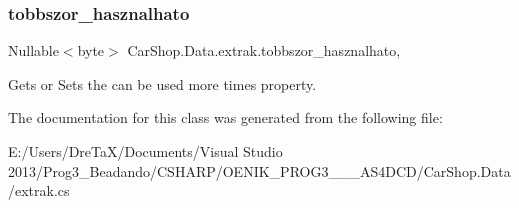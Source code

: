 \mbox{\label{class_car_shop_1_1_data_1_1extrak_a93236e77dec6453b89b5a944ba1c34e7}} 
\subsubsection{\texorpdfstring{tobbszor\+\_\+hasznalhato}{tobbszor\_hasznalhato}}
{\footnotesize\ttfamily Nullable$<$byte$>$ Car\+Shop.\+Data.\+extrak.\+tobbszor\+\_\+hasznalhato\hspace{0.3cm}{\ttfamily [get]}, {\ttfamily [set]}}



Gets or Sets the \textquotesingle{}can be used more times\textquotesingle{} property. 



The documentation for this class was generated from the following file\+:\begin{DoxyCompactItemize}
\item 
E\+:/\+Users/\+Dre\+Ta\+X/\+Documents/\+Visual Studio 2013/\+Prog3\+\_\+\+Beadando/\+C\+S\+H\+A\+R\+P/\+O\+E\+N\+I\+K\+\_\+\+P\+R\+O\+G3\+\_\+\_\+\_\+\+A\+S4\+D\+C\+D/\+Car\+Shop.\+Data/extrak.\+cs\end{DoxyCompactItemize}
